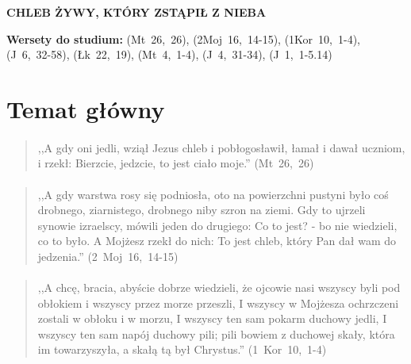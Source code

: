 \documentclass[10pt,a4paper,oneside]{article}
\begin{document}
\centerline{\textbf{\MakeUppercase{Chleb żywy, który zstąpił z nieba}}}
\begin{center}
\textbf{Wersety do studium:} 
\mbox{(Mt 26, 26)}, \mbox{(2Moj 16, 14-15)}, \mbox{(1Kor 10, 1-4)}, \mbox{(J 6, 32-58)}, \mbox{(Łk 22, 19)}, \mbox{(Mt 4, 1-4)}, \mbox{(J 4, 31-34)}, \mbox{(J 1, 1-5.14)}
\end{center}
\section{Temat główny}
\paragraph{}
\begin{quote}
,,A gdy oni jedli, wziął Jezus chleb i pobłogosławił, łamał i dawał uczniom, i rzekł: Bierzcie, jedzcie, to jest ciało moje.'' \mbox{(Mt 26, 26)}
\end{quote}
\paragraph{}
\begin{quote}
,,A gdy warstwa rosy się podniosła, oto na powierzchni pustyni było coś drobnego, ziarnistego, drobnego niby szron na ziemi. Gdy to ujrzeli synowie izraelscy, mówili jeden do drugiego: Co to jest? - bo nie wiedzieli, co to było. A Mojżesz rzekł do nich: To jest chleb, który Pan dał wam do jedzenia.'' \mbox{(2 Moj 16, 14-15)}
\end{quote}
\paragraph{}
\begin{quote}
,,A chcę, bracia, abyście dobrze wiedzieli, że ojcowie nasi wszyscy byli pod obłokiem i wszyscy przez morze przeszli, I wszyscy w Mojżesza ochrzczeni zostali w obłoku i w morzu, I wszyscy ten sam pokarm duchowy jedli, I wszyscy ten sam napój duchowy pili; pili bowiem z duchowej skały, która im towarzyszyła, a skałą tą był Chrystus.'' \mbox{(1 Kor 10, 1-4)}
\end{quote}
\end{document}
